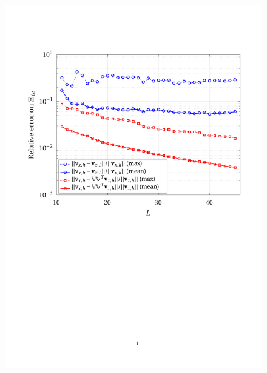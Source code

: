 \documentclass[12pt, a4paper, twoside, openright]{report}
\numberwithin{equation}{chapter}
\theoremstyle{theorem}
\theoremstyle{definition}
\theoremstyle{remark}
\theoremstyle{proposition}
\numberwithin{figure}{chapter}
\begin{document}
	\begin{figure}[H]
		\center
		\includegraphics[scale = 0.75, trim = {1.5cm 12cm 1cm 3.5cm}, clip]{dc_400_vx_error_vs_rank}
	\end{figure}
	
\end{document}
